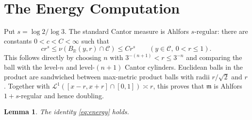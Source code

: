 \documentclass[11pt]{article}
\newtheorem{lemma}{Lemma}
\newcommand{\R}{\mathbb R}
\newcommand{\Ccal}{\mathcal C}
\newcommand{\m}{\mathfrak m}
\begin{document}
\section*{The Energy Computation}

Put $s=\log 2/\log 3$.  The standard Cantor measure is Ahlfors
$s$-regular: there are constants $0<c<C<\infty$ such that
\begin{equation}\label{eq:cantorregular}
 cr^s\leq\nu(B_{\R}(y,r)\cap\Ccal)\leq Cr^s
 \qquad(y\in\Ccal,\ 0<r\leq1).
\end{equation}
This follows directly by choosing $n$ with
$3^{-(n+1)}<r\leq3^{-n}$ and comparing the ball with the level-$n$ and
level-$(n+1)$ Cantor cylinders.  Euclidean balls in the product are
sandwiched between max-metric product balls with radii $r/\sqrt2$ and $r$.
Together with
$\mathcal L^1([x-r,x+r]\cap[0,1])\asymp r$, this proves that $\m$ is
Ahlfors $1+s$-regular and hence doubling.

\begin{lemma}\label{lem:energy}
The identity \eqref{eq:energy} holds.
\end{lemma}
\end{document}
